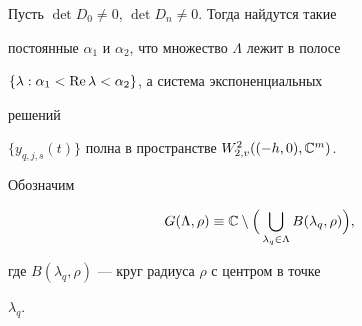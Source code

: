  


\begin{lem} 


Пусть $\det D_0\ne0$, $\det D_n\ne0$. Тогда найдутся такие 


постоянные $\alpha_1$ и $\alpha_2$, что множество $\Lambda$ лежит в полосе 


$\{\lambda:\alpha_1<\operatorname{Re}\lambda<\alpha_2\}$, а система экспоненциальных 


решений 


$\{y_{q,j,s}(t)\}$ полна в пространстве $W^{2}_{2,v}((-h,0),\Bbb C^m)$. 


\end{lem} 


 


Обозначим 


$$ 


G(\Lambda,\rho)\equiv\Bbb C\setminus\Big(\bigcup_{\lambda_q\in\Lambda} 


B(\lambda_q,\rho)\Big), 


$$ 


где $B(\lambda_q,\rho)$ --- круг радиуса $\rho$ с центром в точке 


$\lambda_q$. 


 


